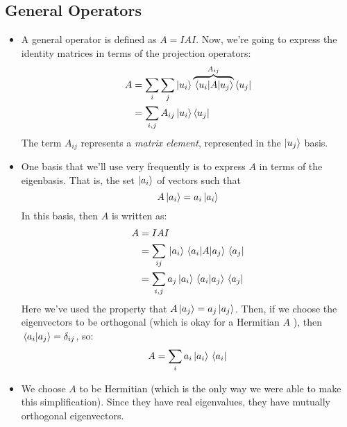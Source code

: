 \subsection{General Operators}
\begin{itemize}
	\item A general operator is defined as \( A = IAI \). Now, we're going to express the identity matrices in terms 
		of the projection operators:
		\begin{align*}
			A &= \sum_i \sum_{j}\ket{u_i}\overbrace{\mel{u_i}{A}{u_j}}^{A_{ij}}\bra{u_j}\\
			  &= \sum_{i, j} A_{ij} \ket{u_i}\bra{u_j}
		\end{align*}
		The term \( A_{ij} \) represents a \textit{matrix element}, represented in the \( \ket{u_j} \) basis. 

	\item One basis that we'll use very frequently is to express \( A \) in terms of the eigenbasis. That is, the 
		set \( \ket{a_i} \) of vectors such that 
		\[
		A\ket{a_i} = a_i \ket{a_i}
		\] 
		In this basis, then \( A \) is written as:
		\begin{align*}
			A &= IAI \\
			  &= \sum_{ij}\ket*{a_i}\mel*{a_i}{A}{a_j}\bra*{a_j}\\
			  &= \sum_{i, j} a_j \ket*{a_i}\braket*{a_i}{a_j}\bra*{a_j} 
		\end{align*}
		Here we've used the property that \( A\ket*{a_j} = a_j\ket*{a_j} \). Then, if we choose the eigenvectors 
		to be orthogonal (which is okay for a Hermitian \( A \) ), then \( \braket*{a_i}{a_j} = \delta_{ij} \), so:
		\[
		A = \sum_i a_i \ket*{a_i}\bra*{a_i}
		\] 
	\item We choose \( A \) to be Hermitian (which is the only way we were able to make this simplification). Since 
		they have real eigenvalues, they have mutually orthogonal eigenvectors.  
\end{itemize}
